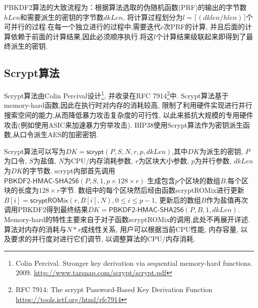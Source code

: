PBKDF2算法的大致流程为：根据算法选取的伪随机函数(PRF)的输出的字节数$hLen$和需要派生的密钥的字节数$dkLen$,
将计算过程划分为$l=\lceil (dklen/hlen) \rceil$个可并行的过程.在每一个独立进行的过程中,需要迭代$c$次PRF的计算,
并且后面的计算依赖于前面的计算结果,因此必须顺序执行.将这$l$个计算结果级联起来即得到了最终派生的密钥.

\subsection{Scrypt算法}
Scrypt算法由Colin Percival设计\footnote{
Colin Percival. Stronger key derivation via sequential memory-hard functions. 2009.
\url{http://www.tarsnap.com/scrypt/scrypt.pdf}},
并收录在RFC 7914\footnote{
RFC 7914: The scrypt Password-Based Key Derivation Function
\url{https://tools.ietf.org/html/rfc7914}
}中.
Scrypt算法基于memory-hard函数,因此在执行时对内存的消耗较高,
限制了利用硬件实现进行并行搜索空间的能力,从而降低暴力攻击复杂度的可行性,
以此来抵抗大规模的专用硬件攻击(例如使用ASIC来加速暴力穷举攻击).
BIP38使用Scrypt算法作为密钥派生函数,从口令派生AES的加密密钥. 

Scrypt算法可以写为$DK = \textsf{scrypt}(P,S,N,r,p,dkLen)$,其中$DK$为派生的密钥,
$P$为口令, $S$为盐值, $N$为CPU/内存消耗参数, $r$为区块大小参数, $p$为并行参数, $dkLen$为$DK$的字节数.
\textsf{scrypt}内部首先调用$\textsf{PBKDF2-HMAC-SHA256}(P, S, 1, p \times 128 \times r)$
生成包含$p$个区块的数组$B$,每个区块的长度为$128\times r$字节.
数组中的每个区块然后经由函数\textsf{scryptROMix}进行更新$B[i]=\textsf{scryptROMix}(r, B[i], N), 0\leq i \leq p-1$,
更新后的数组$B$作为盐值再次调用PBKDF2得到最终结果$DK = \textsf{PBKDF2-HMAC-SHA256} (P, B, 1, dkLen)$.
Memory-hard的特性主要来自于对子函数\textsf{scryptROMix}的调用,此处不再展开详述.
算法对内存的消耗与$N*r$成线性关系, 用户可以根据当前CPU性能, 内存容量, 
以及要求的并行度对进行它们调节, 以调整算法的CPU/内存消耗.


